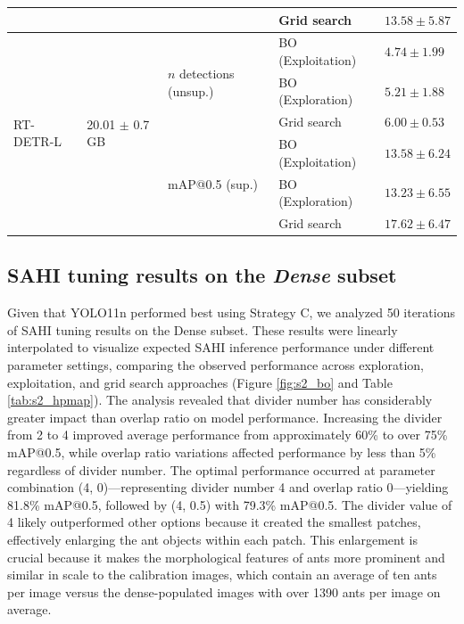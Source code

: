 \begin{table}[h]
\begin{tabular}{lllll}
                            &                                       &                                            & Grid search & $13.58 \pm 5.87$ \\
    \midrule
    \multirow{6}{*}{RT-DETR-L} & \multirow{6}{*}{20.01 $\pm$ 0.7 GB} & \multirow{3}{*}{$n$ detections (unsup.)}& BO (Exploitation) & $4.74 \pm 1.99$ \\
                            &                                       &                                           & BO (Exploration) & $5.21 \pm 1.88$ \\
                            &                                       &                                           & Grid search & $6.00 \pm 0.53$ \\
    \cmidrule{3-5}
                            &                                       & \multirow{3}{*}{mAP@0.5 (sup.)}          & BO (Exploitation) & $13.58 \pm 6.24$ \\
                            &                                       &                                           & BO (Exploration) & $13.23 \pm 6.55$ \\
                            &                                       &                                           & Grid search & $17.62 \pm 6.47$ \\
    \bottomrule
    \end{tabular}

\end{table}


\subsection{SAHI tuning results on the \textit{Dense} subset}

Given that YOLO11n performed best using Strategy C, we analyzed 50 iterations of SAHI tuning results on the Dense subset. These results were linearly interpolated to visualize expected SAHI inference performance under different parameter settings, comparing the observed performance across exploration, exploitation, and grid search approaches (Figure \ref{fig:s2_bo} and Table \ref{tab:s2_hpmap}). 
The analysis revealed that divider number has considerably greater impact than overlap ratio on model performance. Increasing the divider from 2 to 4 improved average performance from approximately 60\% to over 75\% mAP@0.5, while overlap ratio variations affected performance by less than 5\% regardless of divider number. The optimal performance occurred at parameter combination (4, 0)—representing divider number 4 and overlap ratio 0—yielding 81.8\% mAP@0.5, followed by (4, 0.5) with 79.3\% mAP@0.5. The divider value of 4 likely outperformed other options because it created the smallest patches, effectively enlarging the ant objects within each patch. This enlargement is crucial because it makes the morphological features of ants more prominent and similar in scale to the calibration images, which contain an average of ten ants per image versus the dense-populated images with over 1390 ants per image on average.

